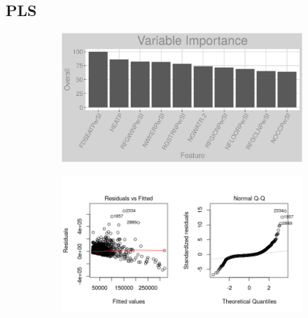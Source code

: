 \subsection{PLS}
\label{appendix:natural_gas:pls}
\begin{figure}[h]
\centering
\begin{subfigure}{1\textwidth}
\centering
\includegraphics[width=.99\textwidth, height=0.3\textheight]{Images/natural_gas_psf_pls_vars.png}
\end{subfigure}
\begin{subfigure}{1\textwidth}
\centering
\includegraphics[width=.99\textwidth, height=0.475\textheight]{Images/natural_gas_psf_pls_res_1.png}
\end{subfigure}
\end{figure}
\FloatBarrier
\newpage
